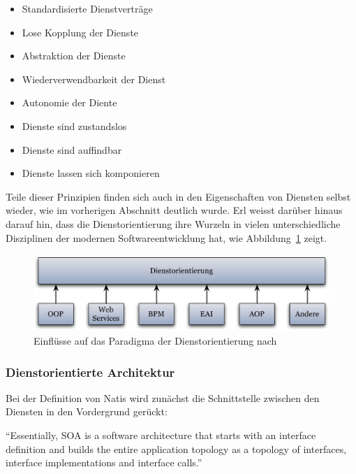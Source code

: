   \begin{itemize}
    \item Standardisierte Dienstverträge
    \item Lose Kopplung der Dienste
    \item Abstraktion der Dienste
    \item Wiederverwendbarkeit der Dienst
    \item Autonomie der Diente
    \item Dienste sind zustandslos
    \item Dienste sind auffindbar
    \item Dienste lassen sich komponieren
  \end{itemize}
  
  Teile dieser Prinzipien finden sich auch in den Eigenschaften von Diensten selbst wieder, wie im vorherigen Abschnitt deutlich wurde. Erl weisst darüber hinaus darauf hin, dass die Dienstorientierung ihre Wurzeln in vielen unterschiedliche Disziplinen der modernen Softwareentwicklung hat, wie Abbildung~\ref{fig:images_Wurzeln_Dienstorientierung} zeigt.
  
\begin{figure}[ht]
  \centering
    \includegraphics[width=.9\textwidth]{images/Wurzeln_Dienstorientierung.pdf}
  \caption{Einflüsse auf das Paradigma der Dienstorientierung nach~\citep{erl2008soa}}
  \label{fig:images_Wurzeln_Dienstorientierung}
\end{figure}


\subsubsection{Dienstorientierte Architektur} %
\label{ssub:definition_dienstorientierte_architektur}

  Bei der Definition von Natis wird zunächst die Schnittstelle zwischen den Diensten in den Vordergrund gerückt:

\begin{definition}\label{def:soa_natis_2003_}
  "`Essentially, SOA is a software architecture that starts with an interface definition and builds the entire application topology as a topology of interfaces, interface implementations and interface calls."'~\emph{\citep[S. 2]{natis2003soa}}
\end{definition}

